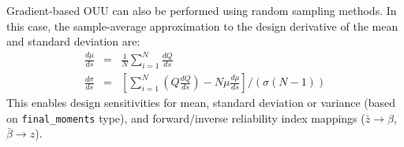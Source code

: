 Gradient-based OUU can also be performed using random sampling methods.
In this case, the sample-average approximation to the design derivative
of the mean and standard deviation are:
\begin{eqnarray}
  \frac{d\mu}{ds}    &=& \frac{1}{N} \sum_{i=1}^N \frac{dQ}{ds} \\
  \frac{d\sigma}{ds} &=& \left[ \sum_{i=1}^N (Q \frac{dQ}{ds})
    - N \mu \frac{d\mu}{ds} \right] / (\sigma (N-1))
\end{eqnarray}
This enables design sensitivities for mean,  standard deviation or
variance (based on {\tt final\_moments} type), and forward/inverse
reliability index mappings
($\bar{z} \rightarrow \beta$, $\bar{\beta} \rightarrow z$).

